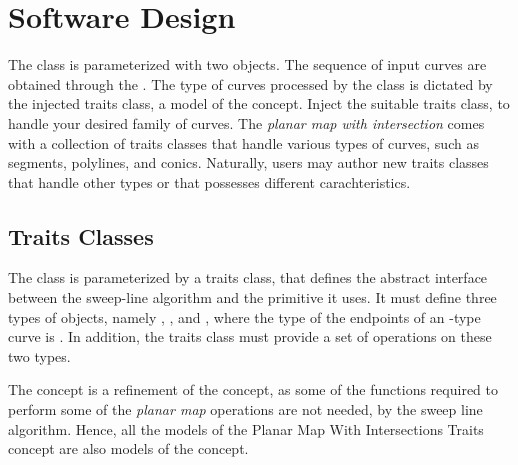 \section{Software Design}

The  class is parameterized with
two objects. The sequence of input curves are obtained through the
. The type of curves processed by the
 class is dictated
by the injected traits class, a model of the 
concept. Inject the suitable traits class, to handle your desired family of
curves. The {\em planar map with intersection} comes with a collection of
traits classes that handle various types of curves, such as segments,
polylines, and conics. Naturally, users may author new traits classes
that handle other types or that possesses different carachteristics.


\subsection{Traits Classes}
The  class is parameterized by a
traits class, that defines the abstract interface between the sweep-line
algorithm and the primitive it uses. It must define three types of objects,
namely , , and ,
where the type of the endpoints of an -type curve
is . In addition, the traits class must provide a set of
operations on these two types.

The  concept is a refinement of the 
 concept, as some of the functions required to
perform some of the {\em planar map} operations are not needed, by the sweep
line algorithm. Hence, all the models of the
Planar Map With Intersections Traits 
concept are also models of the  concept. 

